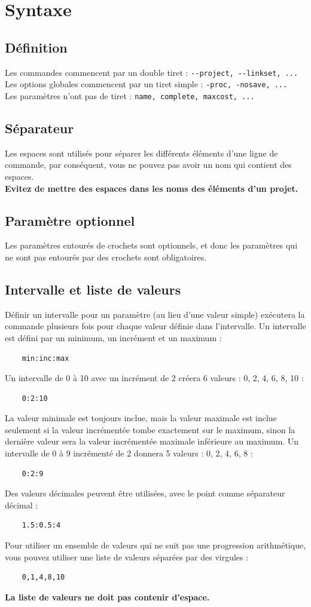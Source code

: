 \documentclass[a4paper,10pt]{report}
\begin{document}
\section{Syntaxe}
\subsection{Définition}
Les commandes commencent par un double tiret : \verb|--project, --linkset, ...|\\
Les options globales commencent par un tiret simple : \verb|-proc, -nosave, ...|\\
Les paramètres n'ont pas de tiret : \verb|name, complete, maxcost, ...|
\subsection{Séparateur}
Les espaces sont utilisés pour séparer les différents éléments d'une ligne de commande, par conséquent, vous ne pouvez pas avoir un nom qui contient des espaces.\\
\textbf{Evitez de mettre des espaces dans les noms des éléments d'un projet.}
\subsection{Paramètre optionnel}
Les paramètres entourés de crochets sont optionnels, et donc les paramètres qui ne sont pas entourés par des crochets sont obligatoires.
\subsection{Intervalle et liste de valeurs}
Définir un intervalle pour un paramètre (au lieu d'une valeur simple) exécutera la commande plusieurs fois pour chaque valeur définie dans l'intervalle.
Un intervalle est défini par un minimum, un incrément et un maximum :
\begin{Verbatim}
	min:inc:max
\end{Verbatim}
Un intervalle de 0 à 10 avec un incrément de 2 créera 6 valeurs : 0, 2, 4, 6, 8, 10 :
\begin{Verbatim}
	0:2:10
\end{Verbatim}
La valeur minimale est toujours inclue, mais la valeur maximale est inclue seulement si la valeur incrémentée tombe exactement sur le maximum, 
sinon la dernière valeur sera la valeur incrémentée maximale inférieure au maximum.
Un intervalle de 0 à 9 incrémenté de 2 donnera 5 valeurs : 0, 2, 4, 6, 8 :
\begin{Verbatim}
	0:2:9
\end{Verbatim}
Des valeurs décimales peuvent être utilisées, avec le point comme séparateur décimal :
\begin{Verbatim}
	1.5:0.5:4
\end{Verbatim}
Pour utiliser un ensemble de valeurs qui ne suit pas une progression arithmétique, vous pouvez utiliser une liste de valeurs séparées par des virgules :
\begin{Verbatim}
	0,1,4,8,10
\end{Verbatim}
\textbf{La liste de valeurs ne doit pas contenir d'espace.}
\end{document}
